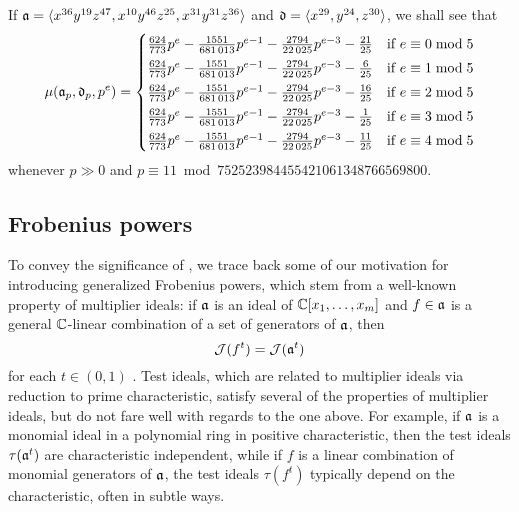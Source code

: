\documentclass{amsart}
\begin{document}
\begin{example}
   \label{ex2 intro}
   If $\mathfrak{a} = \langle x^{36} y^{19} z^{47}, x^{10} y^{46} z^{25}, x^{31} y^{31} z^{36} \rangle$ and $\mathfrak{d} = \langle x^{29},y^{24},z^{30} \rangle$, we shall see that
   \[
    \mu(\mathfrak{a}_p,\mathfrak{d}_p,p^e) =
    \begin{cases}
       \frac{624}{773}p^{e} - \frac{\num{1551}}{\num{681013}}p^{e-1} - \frac{\num{2794}}{\num{22025}}p^{e-3} - \frac{21}{25} & \text{if $e \equiv 0 \bmod 5$}\\[1mm]
       \frac{624}{773}p^{e} - \frac{\num{1551}}{\num{681013}}p^{e-1} - \frac{\num{2794}}{\num{22025}}p^{e-3} - \frac{6}{25} & \text{if $e \equiv 1 \bmod 5$}\\[1mm]
       \frac{624}{773}p^{e} - \frac{\num{1551}}{\num{681013}}p^{e-1} - \frac{\num{2794}}{\num{22025}}p^{e-3} - \frac{16}{25} & \text{if $e \equiv 2 \bmod 5$}\\[1mm]
       \frac{624}{773}p^{e} - \frac{\num{1551}}{\num{681013}}p^{e-1} - \frac{\num{2794}}{\num{22025}}p^{e-3} - \frac{1}{25} & \text{if $e \equiv 3 \bmod 5$}\\[1mm]
       \frac{624}{773}p^{e} - \frac{\num{1551}}{\num{681013}}p^{e-1} - \frac{\num{2794}}{\num{22025}}p^{e-3} - \frac{11}{25} & \text{if $e \equiv 4 \bmod 5$}
    \end{cases}
 \]
 whenever $p \gg 0$  and $p \equiv 11 \bmod \num{752523984455421061348766569800}$.
\end{example}

\subsection{Frobenius powers}
To convey the significance of , we trace back some of our motivation for introducing generalized Frobenius powers, which stem from a well-known property of multiplier ideals:
if $\mathfrak{a}$ is an ideal of $\mathbb{C}[x_1,\ldots,x_m]$ and $f \in \mathfrak{a}$ is a general $\mathbb{C}$-linear combination of a set of generators of $\mathfrak{a}$, then
\[ \mathcal{J}(f^t) = \mathcal{J}(\mathfrak{a}^t)\]
for each $t \in (0,1)$ \cite[Proposition~9.2.28]{lazarsfeld.positivity-II}.
Test ideals, which are related to multiplier ideals via reduction to prime characteristic, satisfy several of the properties of multiplier ideals, but do not fare well with regards to the one above. 
For example, if $\mathfrak{a}$ is a monomial ideal in a polynomial ring in positive characteristic, then the test ideals $\tau(\mathfrak{a}^t)$ are characteristic independent, while if $f$ is a linear combination of monomial generators of $\mathfrak{a}$, the test ideals $\tau(f^t)$ typically depend on the characteristic, often in subtle ways.
\end{document}
